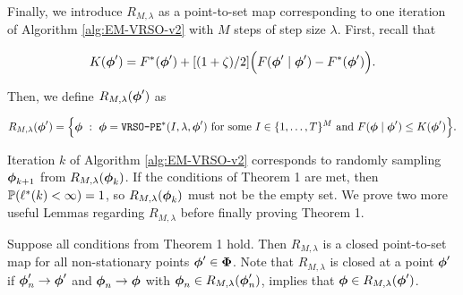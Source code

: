Finally, we introduce $R_{M,\lambda}$ as a point-to-set map corresponding to one iteration of Algorithm \ref{alg:EM-VRSO-v2} with $M$ steps of step size $\lambda$. First, recall that

\begin{equation}
    K(\boldsymbol{\phi}') = F^*(\boldsymbol{\phi}') + [(1 + \zeta)/2] \Big(F(\boldsymbol{\phi}' \mid \boldsymbol{\phi}') - F^*(\boldsymbol{\phi}') \Big). 
\end{equation}

Then, we define $R_{M,\lambda}(\boldsymbol{\phi}')$ as

\begin{equation}
    R_{M,\lambda}(\boldsymbol{\phi}') = \Big\{\boldsymbol{\phi} ~ : ~ \boldsymbol{\phi} = \texttt{VRSO-PE}^*(I,\lambda,\boldsymbol{\phi}') ~ \text{for some} ~ I \in \{1,\ldots,T\}^M ~\text{and}~ F(\boldsymbol{\phi} \mid \boldsymbol{\phi}') \leq K(\boldsymbol{\phi}')\Big\}.
\end{equation}

Iteration $k$ of Algorithm \ref{alg:EM-VRSO-v2} corresponds to randomly sampling $\boldsymbol{\phi}_{k+1}$ from $R_{M,\lambda}(\boldsymbol{\phi}_k)$. If the conditions of Theorem 1 are met, then $\mathbb{P}(\ell^*(k) < \infty) = 1$, so $R_{M,\lambda}(\boldsymbol{\phi}_k)$ must not be the empty set. We prove two more useful Lemmas regarding $R_{M,\lambda}$ before finally proving Theorem 1.

\begin{lemma}
    Suppose all conditions from Theorem 1 hold. Then $R_{M,\lambda}$ is a closed point-to-set map for all non-stationary points $\boldsymbol{\phi}' \in \boldsymbol{\Phi}$. Note that $R_{M,\lambda}$ is closed at a point $\boldsymbol{\phi}'$ if $\boldsymbol{\phi}'_{n} \to \boldsymbol{\phi}'$ and $\boldsymbol{\phi}_{n} \to \boldsymbol{\phi}$ with $\boldsymbol{\phi}_{n} \in R_{M,\lambda}(\boldsymbol{\phi}'_{n})$, implies that $\boldsymbol{\phi} \in R_{M,\lambda}(\boldsymbol{\phi}')$. 
\end{lemma}

